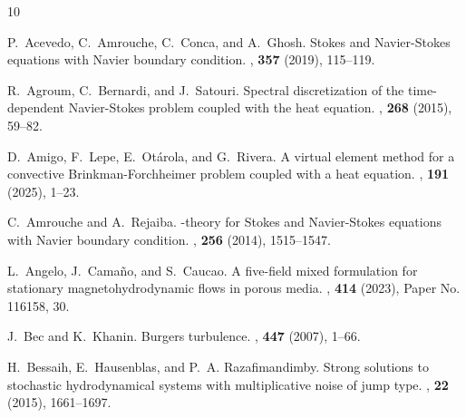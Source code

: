 \documentclass[11pt, reqno]{amsart}
\theoremstyle{definition}
\numberwithin{equation}{section}
\begin{document}
\newcommand{\noopsort}[1]{}\def\cprime{$'$}
\def\soft#1{\leavevmode\setbox0=\hbox{h}\dimen7=\ht0\advance \dimen7
	by-1ex\relax\if t#1\relax\rlap{\raise.6\dimen7
		\hbox{\kern.3ex\char'47}}#1\relax\else\if T#1\relax
	\rlap{\raise.5\dimen7\hbox{\kern1.3ex\char'47}}#1\relax \else\if
	d#1\relax\rlap{\raise.5\dimen7\hbox{\kern.9ex \char'47}}#1\relax\else\if
	D#1\relax\rlap{\raise.5\dimen7 \hbox{\kern1.4ex\char'47}}#1\relax\else\if
	l#1\relax \rlap{\raise.5\dimen7\hbox{\kern.4ex\char'47}}#1\relax \else\if
	L#1\relax\rlap{\raise.5\dimen7\hbox{\kern.7ex
			\char'47}}#1\relax\else\message{accent \string\soft \space #1 not
		defined!}#1\relax\fi\fi\fi\fi\fi\fi}
\begin{thebibliography}{10}
	
	P.~Acevedo, C.~Amrouche, C.~Conca, and A.~Ghosh.
	\newblock Stokes and {N}avier-{S}tokes equations with {N}avier boundary
	condition.
	,  {\bf 357} (2019), 115--119.
	
	R.~Agroum, C.~Bernardi, and J.~Satouri.
	\newblock Spectral discretization of the time-dependent {N}avier-{S}tokes
	problem coupled with the heat equation.
	,  {\bf 268} (2015), 59--82.
	
	D.~Amigo, F.~Lepe, E.~Ot\'arola, and G.~Rivera.
	\newblock A virtual element method for a convective {B}rinkman-{F}orchheimer
	problem coupled with a heat equation.
	,  {\bf 191} (2025), 1--23.
	
	C.~Amrouche and A.~Rejaiba.
	-theory for {S}tokes and {N}avier-{S}tokes equations with
	{N}avier boundary condition.
	,  {\bf 256} (2014), 1515--1547.
	
	L.~Angelo, J.~Cama\~no, and S.~Caucao.
	\newblock A five-field mixed formulation for stationary magnetohydrodynamic
	flows in porous media.
	,  {\bf 414} (2023), Paper
	No. 116158, 30.
	
	J.~Bec and K.~Khanin.
	\newblock Burgers turbulence.
	,  {\bf 447} (2007), 1--66.
	
	H.~Bessaih, E.~Hausenblas, and P.~A. Razafimandimby.
	\newblock Strong solutions to stochastic hydrodynamical systems with
	multiplicative noise of jump type.
	,  {\bf 22} (2015),
	1661--1697.
	

\end{thebibliography}
\end{document}
